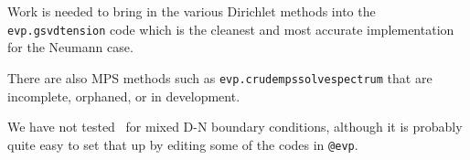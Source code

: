 Work is needed to bring in the various Dirichlet methods into the
{\tt evp.gsvdtension} code which is the cleanest and most accurate
implementation for the Neumann case.

There are also MPS methods such as {\tt evp.crudempssolvespectrum}
that are incomplete, orphaned, or in development.

We have not tested \mpspack\ for mixed D-N boundary conditions, although
it is probably quite easy to set that up by editing some of the
codes in {\tt @evp}.


